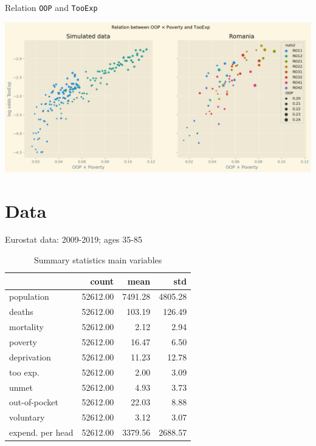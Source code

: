 \documentclass[presentation]{beamer}
\begin{document}
\begin{frame}[label={sec:org0a2c46d},fragile]{Relation \texttt{OOP} and \texttt{TooExp}}
 \begin{center}
\includegraphics[width=.9\linewidth]{./figures/Parametric3.png}
\label{fig:Parametric}
\end{center}
\end{frame}

\section*{Data}
\label{sec:orgbf3e5c9}

\begin{frame}[label={sec:orgd4bfbfe}]{Eurostat data: 2009-2019; ages 35-85}
\begin{table}[htbp]
\caption{\label{tab:summary}Summary statistics main variables}
\centering
\begin{tabular}{lrrr}
 & count & mean & std\\
\hline
population & 52612.00 & 7491.28 & 4805.28\\
deaths & 52612.00 & 103.19 & 126.49\\
mortality & 52612.00 & 2.12 & 2.94\\
poverty & 52612.00 & 16.47 & 6.50\\
deprivation & 52612.00 & 11.23 & 12.78\\
too exp. & 52612.00 & 2.00 & 3.09\\
unmet & 52612.00 & 4.93 & 3.73\\
out-of-pocket & 52612.00 & 22.03 & 8.88\\
voluntary & 52612.00 & 3.12 & 3.07\\
expend. per head & 52612.00 & 3379.56 & 2688.57\\
\end{tabular}
\end{table}
\end{frame}
\end{document}
